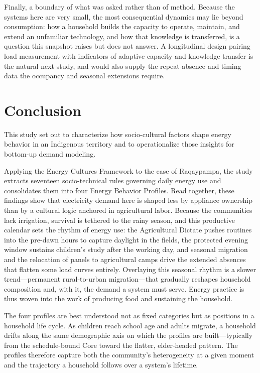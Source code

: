 \documentclass[final,3p,times,onecolumn]{elsarticle}
\begin{document}
Finally, a boundary of what was asked rather than of method. Because the systems here are very small, the most consequential dynamics may lie beyond consumption: how a household builds the capacity to operate, maintain, and extend an unfamiliar technology, and how that knowledge is transferred, is a question this snapshot raises but does not answer. A longitudinal design pairing load measurement with indicators of adaptive capacity and knowledge transfer is the natural next study, and would also supply the repeat-absence and timing data the occupancy and seasonal extensions require.


\section{Conclusion}
\label{sec:conslusion}

This study set out to characterize how socio-cultural factors shape energy behavior in an Indigenous territory and to operationalize those insights for bottom-up demand modeling.

Applying the Energy Cultures Framework to the case of Raqaypampa, the study extracts seventeen socio-technical rules governing daily energy use and consolidates them into four Energy Behavior Profiles. Read together, these findings show that electricity demand here is shaped less by appliance ownership than by a cultural logic anchored in agricultural labor. Because the communities lack irrigation, survival is tethered to the rainy season, and this productive calendar sets the rhythm of energy use: the Agricultural Dictate pushes routines into the pre-dawn hours to capture daylight in the fields, the protected evening window sustains children's study after the working day, and seasonal migration and the relocation of panels to agricultural camps drive the extended absences that flatten some load curves entirely. Overlaying this seasonal rhythm is a slower trend—permanent rural-to-urban migration—that gradually reshapes household composition and, with it, the demand a system must serve. Energy practice is thus woven into the work of producing food and sustaining the household.

The four profiles are best understood not as fixed categories but as positions in a household life cycle. As children reach school age and adults migrate, a household drifts along the same demographic axis on which the profiles are built—typically from the schedule-bound Core toward the flatter, elder-headed pattern. The profiles therefore capture both the community's heterogeneity at a given moment and the trajectory a household follows over a system's lifetime.
\end{document}
